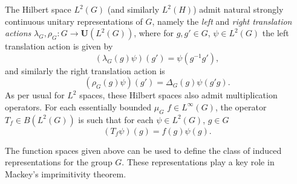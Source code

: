 \documentclass[sn-mathphys-num]{sn-jnl}%
\numberwithin{equation}{section}
\theoremstyle{thmstyleone}%
\theoremstyle{thmstyletwo}%
\theoremstyle{thmstylethree}%
\begin{document}
The Hilbert space $L^2(G)$ (and similarly $L^2(H)$) admit natural strongly continuous unitary representations of $G$, namely the \emph{left} and \emph{right translation actions}
$\lambda_G,\rho_G:G\to \mathbf{U}(L^2(G))$, where for $g,g'\in G$, $\psi\in L^2(G)$ the left translation action is given by
\begin{equation}
\label{eq:left_action}
(\lambda_G(g)\psi)(g')=\psi(g^{-1}g'),\end{equation}
and similarly the right translation action is
\begin{equation}
\label{eq:right_action}
(\rho_G(g)\psi)(g')=\Delta_G(g)\psi(g'g).\end{equation}
As per usual for $L^2$ spaces, these Hilbert spaces also admit multiplication operators. For each essentially bounded $\mu_G$ $f\in L^\infty(G)$, the operator $T_f\in B(L^2(G))$ is such that for each $\psi\in L^2(G)$, $g\in G$
\begin{equation}
    (T_f\psi)(g)=f(g)\psi(g).
\end{equation}

The function spaces given above can be used to define the class of induced representations for the group $G$. These representations play a key role in Mackey's imprimitivity theorem.
\end{document}
